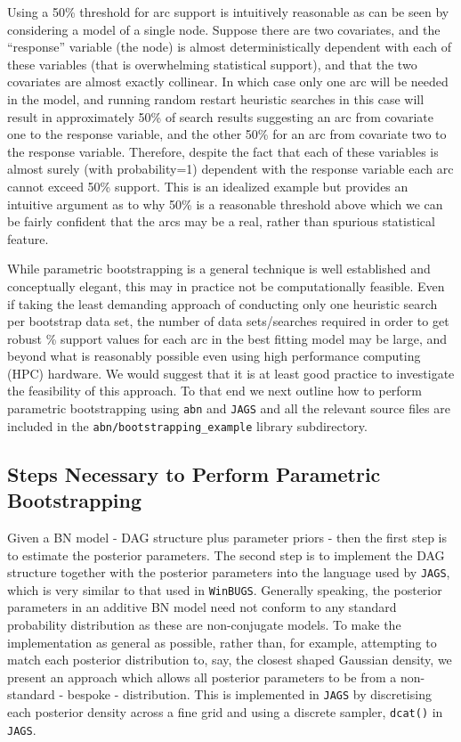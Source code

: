 \documentclass[nojss]{jss}
\begin{document}
Using a 50\% threshold for arc support is intuitively reasonable as can be seen by considering a model of a single node. Suppose there are two covariates, and the ``response'' variable (the node) is almost deterministically dependent with each of these variables (that is overwhelming statistical support), and that the two covariates are almost exactly collinear. In which case only one arc will be needed in the model, and running random restart heuristic searches in this case will result in approximately 50\% of search results suggesting an arc from covariate one to the response variable, and the other 50\% for an arc from covariate two to the response variable. Therefore,  despite the fact that each of these variables is almost surely (with probability=1) dependent with the response variable each arc cannot exceed 50\% support. This is an idealized example but provides an intuitive argument as to why 50\% is a reasonable threshold above which we can be fairly confident that the arcs may be a real, rather than spurious statistical feature. 

While parametric bootstrapping is a general technique is well established and conceptually elegant, this may in practice not be computationally feasible. Even if taking the least demanding approach of conducting only one heuristic search per bootstrap data set, the number of data sets/searches required in order to get robust \% support values for each arc in the best fitting model may be large, and beyond what is reasonably possible even using high performance computing (HPC) hardware. We would suggest that it is at least good practice to investigate the feasibility of this approach. To that end we next outline how to perform parametric bootstrapping using {\tt abn} and {\tt JAGS} and all the relevant source files are included in the {\tt abn/bootstrapping\_example} library subdirectory.


\subsection{Steps Necessary to Perform Parametric Bootstrapping}
Given a BN model - DAG structure plus parameter priors - then the first step is to estimate the posterior parameters. The second step is to implement the DAG structure together with the posterior parameters into the language used by {\tt JAGS}, which is very similar to that used in {\tt WinBUGS}. Generally speaking, the posterior parameters in an additive BN model need not conform to any standard probability distribution as these are non-conjugate models. To make the implementation as general as possible, rather than, for example, attempting to match each posterior distribution to, say, the closest shaped Gaussian density, we present an approach which allows all posterior parameters to be from a non-standard - bespoke - distribution. This is implemented in {\tt JAGS} by discretising each posterior density across a fine grid and using a discrete sampler, {\tt dcat()} in {\tt JAGS}.   
\end{document}

